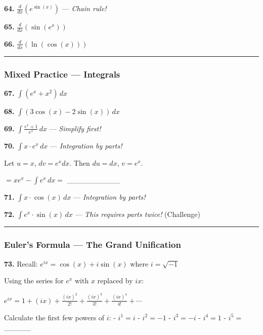\documentclass[
  11pt,
]{article}
\begin{document}
\textbf{64.} \(\frac{d}{dx}(e^{\sin(x)})\) --- \emph{Chain rule!}

\textbf{65.} \(\frac{d}{dx}(\sin(e^x))\)

\textbf{66.} \(\frac{d}{dx}(\ln(\cos(x)))\)

\begin{center}\rule{0.5\linewidth}{0.5pt}\end{center}

\hypertarget{mixed-practice-integrals}{%
\subsubsection{Mixed Practice ---
Integrals}\label{mixed-practice-integrals}}

\textbf{67.} \(\int (e^x + x^2) \, dx\)

\textbf{68.} \(\int (3\cos(x) - 2\sin(x)) \, dx\)

\textbf{69.} \(\int \frac{e^x + 1}{e^x} \, dx\) --- \emph{Simplify
first!}

\textbf{70.} \(\int x \cdot e^x \, dx\) --- \emph{Integration by parts!}

Let \(u = x\), \(dv = e^x dx\). Then \(du = dx\), \(v = e^x\).

\(= xe^x - \int e^x \, dx ={}\) \_\_\_\_\_\_\_\_\_\_

\textbf{71.} \(\int x \cdot \cos(x) \, dx\) --- \emph{Integration by
parts!}

\textbf{72.} \(\int e^x \cdot \sin(x) \, dx\) --- \emph{This requires
parts twice!} (Challenge)

\begin{center}\rule{0.5\linewidth}{0.5pt}\end{center}

\hypertarget{eulers-formula-the-grand-unification}{%
\subsubsection{Euler's Formula --- The Grand
Unification}\label{eulers-formula-the-grand-unification}}

\textbf{73.} Recall: \(e^{ix} = \cos(x) + i\sin(x)\) where
\(i = \sqrt{-1}\)

Using the series for \(e^x\) with \(x\) replaced by \(ix\):

\(e^{ix} = 1 + (ix) + \frac{(ix)^2}{2!} + \frac{(ix)^3}{3!} + \frac{(ix)^4}{4!} + \cdots\)

Calculate the first few powers of \(i\): - \(i^1 = i\) - \(i^2 = -1\) -
\(i^3 = -i\) - \(i^4 = 1\) - \(i^5 ={}\) \_\_\_\_\_
\end{document}
